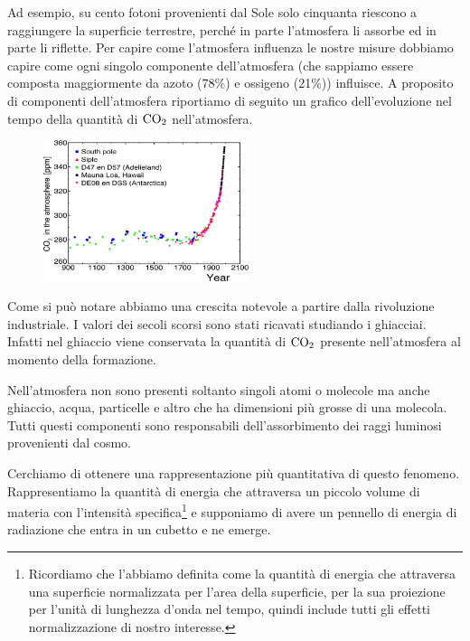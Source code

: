 Ad esempio, su cento fotoni provenienti dal Sole solo cinquanta riescono a raggiungere la superficie terrestre, perché in parte l'atmosfera li assorbe ed in parte li riflette. Per capire come l'atmosfera influenza le nostre misure dobbiamo capire come ogni singolo componente dell'atmosfera (che sappiamo essere composta maggiormente da azoto (78\%) e ossigeno (21\%)) influisce. A proposito di componenti dell'atmosfera riportiamo di seguito un grafico dell'evoluzione nel tempo della quantità di $\rm CO_2$ nell'atmosfera.

\begin{figure}[H]
   \centering
   \includegraphics[width=6cm]{grafico CO_2.jpg}
\end{figure}

Come si può notare abbiamo una crescita notevole a partire dalla rivoluzione industriale. I valori dei secoli scorsi sono stati ricavati studiando i ghiacciai. Infatti nel ghiaccio viene conservata la quantità di $\rm CO_2$ presente nell'atmosfera al momento della formazione.

Nell'atmosfera non sono presenti soltanto singoli atomi o molecole ma anche ghiaccio, acqua, particelle e altro che ha dimensioni più grosse di una molecola. Tutti questi componenti sono responsabili dell'assorbimento dei raggi luminosi provenienti dal cosmo.

Cerchiamo di ottenere una rappresentazione più quantitativa di questo fenomeno. Rappresentiamo la quantità di energia che attraversa un piccolo volume di materia con l'intensità specifica\footnote{Ricordiamo che l'abbiamo definita come la quantità di energia che attraversa una superficie normalizzata per l'area della superficie, per la sua proiezione per l'unità di lunghezza d'onda nel tempo, quindi include tutti gli effetti normalizzazione di nostro interesse.} e supponiamo di avere un pennello di energia di radiazione che entra in un cubetto e ne emerge.

